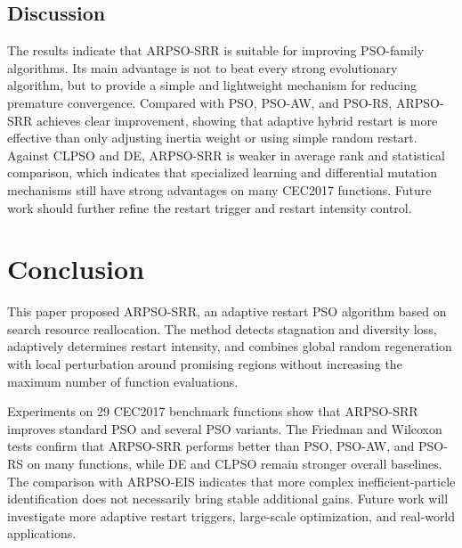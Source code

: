 \documentclass[conference]{IEEEtran}
\begin{document}
\subsection{Discussion}
The results indicate that ARPSO-SRR is suitable for improving PSO-family algorithms. Its main advantage is not to beat every strong evolutionary algorithm, but to provide a simple and lightweight mechanism for reducing premature convergence. Compared with PSO, PSO-AW, and PSO-RS, ARPSO-SRR achieves clear improvement, showing that adaptive hybrid restart is more effective than only adjusting inertia weight or using simple random restart. Against CLPSO and DE, ARPSO-SRR is weaker in average rank and statistical comparison, which indicates that specialized learning and differential mutation mechanisms still have strong advantages on many CEC2017 functions. Future work should further refine the restart trigger and restart intensity control.


\section{Conclusion}\label{sec:conclusion}
This paper proposed ARPSO-SRR, an adaptive restart PSO algorithm based on search resource reallocation. The method detects stagnation and diversity loss, adaptively determines restart intensity, and combines global random regeneration with local perturbation around promising regions without increasing the maximum number of function evaluations.

Experiments on 29 CEC2017 benchmark functions show that ARPSO-SRR improves standard PSO and several PSO variants. The Friedman and Wilcoxon tests confirm that ARPSO-SRR performs better than PSO, PSO-AW, and PSO-RS on many functions, while DE and CLPSO remain stronger overall baselines. The comparison with ARPSO-EIS indicates that more complex inefficient-particle identification does not necessarily bring stable additional gains. Future work will investigate more adaptive restart triggers, large-scale optimization, and real-world applications.
\end{document}
